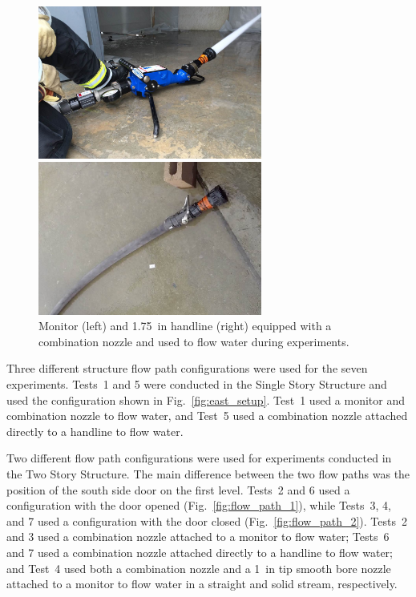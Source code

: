 \documentclass[12pt,oneside]{book}
\begin{document}
\begin{figure}[!ht]
	\minipage{3in}
	\begin{center}
		\includegraphics[width=2.9in]{../Figures/Pictures/monitor}
	\end{center} 
	\endminipage \hfill
	\minipage{3in}
	\begin{center}
		\includegraphics[width=2.9in]{../Figures/Pictures/handline}
	\end{center}
	\endminipage \hfill
	\caption[Monitor and handline equipped with a combination nozzle.]{Monitor (left) and 1.75~in handline (right) equipped with a combination nozzle and used to flow water during experiments.}
	\label{fig:monitor+handline}
\end{figure}
\FloatBarrier

Three different structure flow path configurations were used for the seven experiments. Tests~1 and 5 were conducted in the Single Story Structure and used the configuration shown in Fig.~\ref{fig:east_setup}. Test~1 used a monitor and combination nozzle to flow water, and Test~5 used a combination nozzle attached directly to a handline to flow water.

Two different flow path configurations were used for experiments conducted in the Two Story Structure. The main difference between the two flow paths was the position of the south side door on the first level. Tests~2 and 6 used a configuration with the door opened (Fig.~\ref{fig:flow_path_1}), while Tests~3, 4, and 7 used a configuration with the door closed (Fig.~\ref{fig:flow_path_2}). Tests~2 and 3 used a combination nozzle attached to a monitor to flow water; Tests~6 and 7 used a combination nozzle attached directly to a handline to flow water; and Test~4 used both a combination nozzle and a 1~in tip smooth bore nozzle attached to a monitor to flow water in a straight and solid stream, respectively. 
\end{document}
